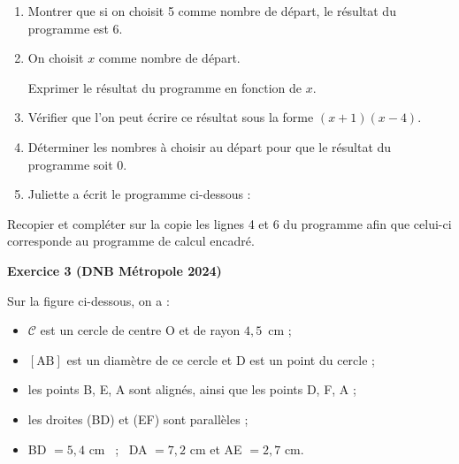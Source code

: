 \documentclass{article}
\begin{document}
\begin{enumerate}
\item Montrer que si on choisit 5 comme nombre de départ, le résultat du programme est 6.
\item On choisit $x$ comme nombre de départ.

Exprimer le résultat du programme en fonction de $x$.
\item Vérifier que l'on peut écrire ce résultat sous la forme $(x+ 1)(x - 4)$.
\item Déterminer les nombres à choisir au départ pour que le résultat du programme soit 0.
\item Juliette a écrit le programme ci-dessous :

\begin{scratch}
\end{scratch}
\end{enumerate}

\medskip

Recopier et compléter sur la copie les lignes 4 et 6 du programme afin que celui-ci corresponde au programme de calcul encadré.

\bigskip

\newpage\textbf{Exercice 3 (DNB Métropole 2024)}

\medskip

Sur la figure ci-dessous, on a :

\medskip

\begin{itemize}
\item $\mathcal{C}$ est un cercle de centre O et de rayon $4,5$~cm ;
\item $[\text{AB}]$ est un diamètre de ce cercle et D est un point du cercle ;
\item les points B, E, A sont alignés, ainsi que les points D, F{}, A ;
\item les droites (BD) et (EF) sont parallèles ;
\item BD $= 5,4$ cm ~;~ DA $= 7,2$ cm \:et\: AE $= 2,7$ cm.
\end{itemize}
\end{document}
